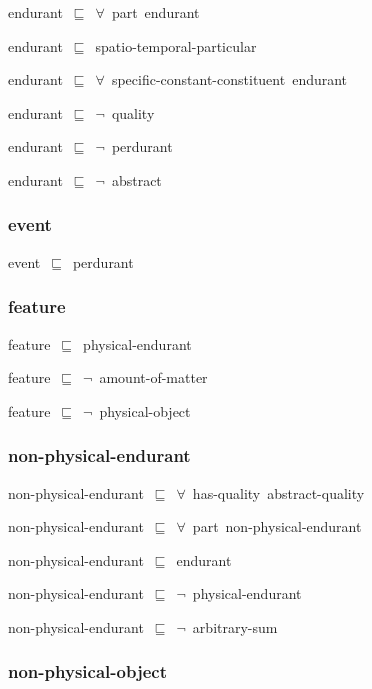 \documentclass{article}
\begin{document}
endurant~\ensuremath{\sqsubseteq}~\ensuremath{\forall}~part~endurant~

endurant~\ensuremath{\sqsubseteq}~spatio-temporal-particular~

endurant~\ensuremath{\sqsubseteq}~\ensuremath{\forall}~specific-constant-constituent~endurant~

endurant~\ensuremath{\sqsubseteq}~\ensuremath{\lnot}~quality

endurant~\ensuremath{\sqsubseteq}~\ensuremath{\lnot}~perdurant

endurant~\ensuremath{\sqsubseteq}~\ensuremath{\lnot}~abstract

\subsubsection*{event}

event~\ensuremath{\sqsubseteq}~perdurant~

\subsubsection*{feature}

feature~\ensuremath{\sqsubseteq}~physical-endurant~

feature~\ensuremath{\sqsubseteq}~\ensuremath{\lnot}~amount-of-matter

feature~\ensuremath{\sqsubseteq}~\ensuremath{\lnot}~physical-object

\subsubsection*{non-physical-endurant}

non-physical-endurant~\ensuremath{\sqsubseteq}~\ensuremath{\forall}~has-quality~abstract-quality~

non-physical-endurant~\ensuremath{\sqsubseteq}~\ensuremath{\forall}~part~non-physical-endurant~

non-physical-endurant~\ensuremath{\sqsubseteq}~endurant~

non-physical-endurant~\ensuremath{\sqsubseteq}~\ensuremath{\lnot}~physical-endurant

non-physical-endurant~\ensuremath{\sqsubseteq}~\ensuremath{\lnot}~arbitrary-sum

\subsubsection*{non-physical-object}
\end{document}
